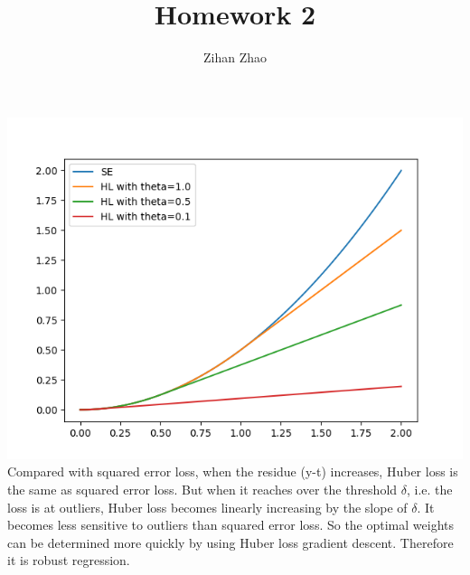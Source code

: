 \documentclass{article}
\author{Zihan Zhao}
\affil{1001103708}
\title{Homework 2}
\date{}
\begin{document}
\maketitle
\section{}
\renewcommand{\thesubsection}{(\alph{subsection})}
\subsection{}
\includegraphics{q1a.png}
Compared with squared error loss, when the residue (y-t) increases, Huber loss is the same as squared error loss. But when it reaches over the threshold $\delta$, i.e. the loss is at outliers, Huber loss becomes linearly increasing by the slope of $\delta$. It becomes less sensitive to outliers than squared error loss. So the optimal weights can be determined more quickly by using Huber loss gradient descent. Therefore it is robust regression.
\end{document}
